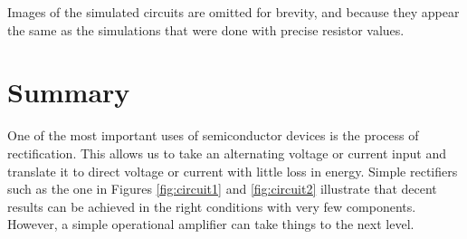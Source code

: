 \documentclass{article}
\begin{document}
Images of the simulated circuits are omitted
for brevity, and because they appear the same
as the simulations that were done with precise
resistor values.

\section{Summary}

One of the most important uses of semiconductor devices
is the process of rectification. This allows us to
take an alternating voltage or current input and translate
it to direct voltage or current with little loss in
energy. Simple rectifiers such as the one in Figures
\ref{fig:circuit1} and \ref{fig:circuit2} illustrate
that decent results can be achieved in the right conditions
with very few components. However, a simple operational
amplifier can take things to the next level.
\end{document}
